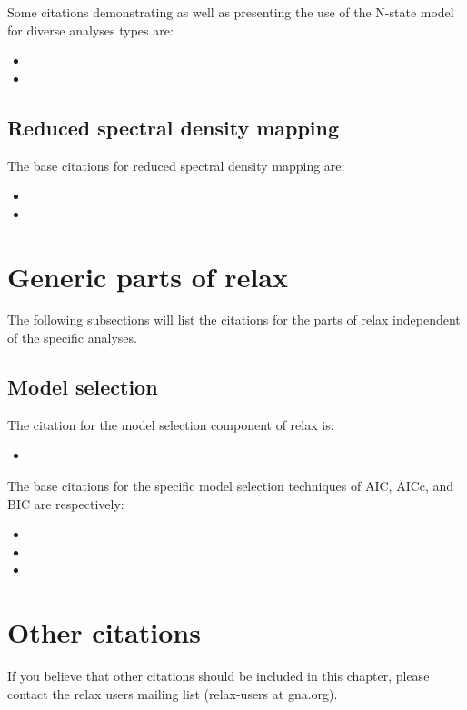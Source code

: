 Some citations demonstrating as well as presenting the use of the N-state model for diverse analyses types are:

\begin{itemize}
\item {}
\item {}
\end{itemize}



\subsection{Reduced spectral density mapping}

The base citations for reduced spectral density mapping are:

\begin{itemize}
\item {}
\item {}
\end{itemize}




\section{Generic parts of relax}

The following subsections will list the citations for the parts of relax independent of the specific analyses.



\subsection{Model selection}

The citation for the model selection component of relax is:

\begin{itemize}
\item {}
\end{itemize}

The base citations for the specific model selection techniques of AIC, AICc, and BIC are respectively:

\begin{itemize}
\item {}
\item {}
\item {}
\end{itemize}




\section{Other citations}

If you believe that other citations should be included in this chapter, please contact the relax users mailing list (relax-users at gna.org).

